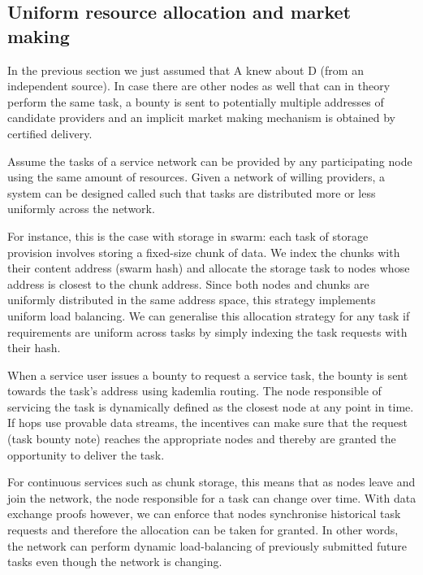 \subsection{Uniform resource allocation and market making}

In the previous section we just assumed that A knew about D (from an independent source).
In case there are other nodes as well that can in theory perform the same task,
a bounty is sent to potentially multiple addresses of candidate providers
and an implicit market making mechanism is obtained by certified delivery.

Assume the tasks of a service network can be provided by any participating node using
the same amount of resources. Given a network of willing providers, a system can be designed
called 
such that tasks are distributed more or less uniformly across the network.

For instance, this is the case with storage in swarm:
each task of storage provision involves storing a fixed-size chunk of data.
We index the chunks with their content address (swarm hash) and allocate the storage task
to nodes whose address is closest to the chunk address.
Since both nodes and chunks are uniformly distributed in the same address space,
this strategy implements uniform load balancing. We can generalise this allocation
strategy for any task if requirements
are uniform across tasks by simply indexing the task requests with their hash.

When a service user issues a bounty to request a service task, the bounty
is sent towards the task's address using kademlia routing.
The node responsible of servicing the task is dynamically defined as the closest node at any point in time.
If hops use provable data streams, the incentives can make sure that the request (task bounty note) reaches the appropriate nodes and thereby are granted the opportunity to deliver the task.

For continuous services such as chunk storage, this means that as nodes leave
and join the network, the node responsible for a task can change over time.
With data exchange proofs however, we can enforce that nodes synchronise historical
task requests and therefore the allocation can be taken for granted. In other words, the network
can perform dynamic load-balancing of previously submitted future tasks even though
the network is changing.

